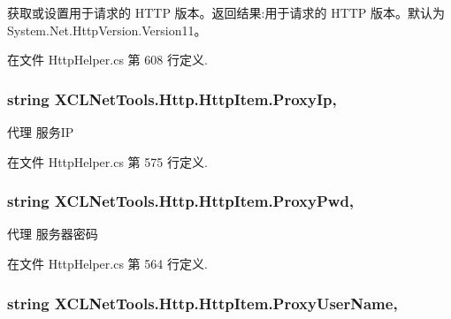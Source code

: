 获取或设置用于请求的 H\-T\-T\-P 版本。返回结果\-:用于请求的 H\-T\-T\-P 版本。默认为 System.\-Net.\-Http\-Version.\-Version11。 



在文件 Http\-Helper.\-cs 第 608 行定义.

\hypertarget{class_x_c_l_net_tools_1_1_http_1_1_http_item_a5069c1ced32908ab2c2e83858ff57d6a}{
\subsubsection[{Proxy\-Ip}]{\setlength{\rightskip}{0pt plus 5cm}string X\-C\-L\-Net\-Tools.\-Http.\-Http\-Item.\-Proxy\-Ip\hspace{0.3cm}{\ttfamily [get]}, {\ttfamily [set]}}}\label{class_x_c_l_net_tools_1_1_http_1_1_http_item_a5069c1ced32908ab2c2e83858ff57d6a}


代理 服务\-I\-P 



在文件 Http\-Helper.\-cs 第 575 行定义.

\hypertarget{class_x_c_l_net_tools_1_1_http_1_1_http_item_ab65bb3daab6ab5ec9ee4ebc74064726a}{
\subsubsection[{Proxy\-Pwd}]{\setlength{\rightskip}{0pt plus 5cm}string X\-C\-L\-Net\-Tools.\-Http.\-Http\-Item.\-Proxy\-Pwd\hspace{0.3cm}{\ttfamily [get]}, {\ttfamily [set]}}}\label{class_x_c_l_net_tools_1_1_http_1_1_http_item_ab65bb3daab6ab5ec9ee4ebc74064726a}


代理 服务器密码 



在文件 Http\-Helper.\-cs 第 564 行定义.

\hypertarget{class_x_c_l_net_tools_1_1_http_1_1_http_item_a7f7b9d839cae3694aced2cbcb3993183}{
\subsubsection[{Proxy\-User\-Name}]{\setlength{\rightskip}{0pt plus 5cm}string X\-C\-L\-Net\-Tools.\-Http.\-Http\-Item.\-Proxy\-User\-Name\hspace{0.3cm}{\ttfamily [get]}, {\ttfamily [set]}}}\label{class_x_c_l_net_tools_1_1_http_1_1_http_item_a7f7b9d839cae3694aced2cbcb3993183}


